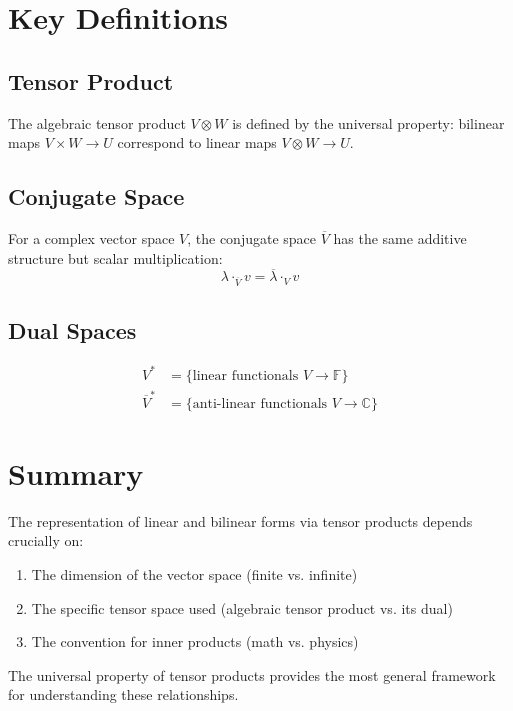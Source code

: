 \documentclass[aps,prl,reprint]{revtex4-2}
\begin{document}
\section{Key Definitions}

\subsection{Tensor Product}
The algebraic tensor product $V \otimes W$ is defined by the universal property: bilinear maps $V \times W \to U$ correspond to linear maps $V \otimes W \to U$.

\subsection{Conjugate Space}
For a complex vector space $V$, the conjugate space $\overline{V}$ has the same additive structure but scalar multiplication:
\[
\lambda \cdot_{\overline{V}} v = \overline{\lambda} \cdot_V v
\]

\subsection{Dual Spaces}
\begin{align*}
V^* &= \{ \text{linear functionals } V \to \mathbb{F} \} \\
\overline{V}^* &= \{ \text{anti-linear functionals } V \to \mathbb{C} \}
\end{align*}

\section{Summary}

The representation of linear and bilinear forms via tensor products depends crucially on:
\begin{enumerate}
\item The dimension of the vector space (finite vs. infinite)
\item The specific tensor space used (algebraic tensor product vs. its dual)
\item The convention for inner products (math vs. physics)
\end{enumerate}

The universal property of tensor products provides the most general framework for understanding these relationships.
\end{document}
